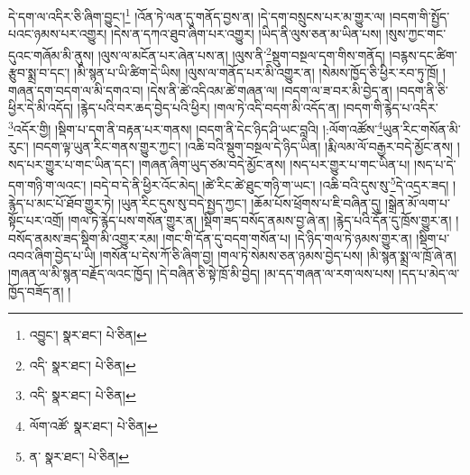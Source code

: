 དེ་དག་ལ་འདིར་ཅི་ཞིག་བྱུང་།\footnote{འབྱུང་།  སྣར་ཐང་།  པེ་ཅིན། } །འོན་ཏེ་ལན་དུ་གནོད་བྱས་ན། །དེ་དག་བསྲུངས་པར་མ་གྱུར་ལ། །བདག་གི་སྤྱོད་པའང་ཉམས་པར་འགྱུར། །དེས་ན་དཀའ་ཐུབ་ཞིག་པར་འགྱུར། །ཡིད་ནི་ལུས་ཅན་མ་ཡིན་པས། །སུས་ཀྱང་གང་དུའང་གཞོམ་མི་ནུས། །ལུས་ལ་མངོན་པར་ཞེན་པས་ན། །ལུས་ནི་\footnote{འདི་  སྣར་ཐང་།  པེ་ཅིན། }སྡུག་བསྔལ་དག་གིས་གནོད། །བརྙས་དང་ཚིག་རྩུབ་སྨྲ་བ་དང་། །མི་སྙན་པ་ཡི་ཚིག་དེ་ཡིས། །ལུས་ལ་གནོད་པར་མི་འགྱུར་ན། །སེམས་ཁྱོད་ཅི་ཕྱིར་རབ་ཏུ་ཁྲོ། །གཞན་དག་བདག་ལ་མི་དགའ་བ། །དེས་ནི་ཚེ་འདིའམ་ཚེ་གཞན་ལ། །བདག་ལ་ཟ་བར་མི་བྱེད་ན། །བདག་ནི་ཅི་ཕྱིར་དེ་མི་འདོད། །རྙེད་པའི་བར་ཆད་བྱེད་པའི་ཕྱིར། །གལ་ཏེ་འདི་བདག་མི་འདོད་ན། །བདག་གི་རྙེད་པ་འདིར་\footnote{འདི་  སྣར་ཐང་།  པེ་ཅིན། }འདོར་གྱི། །སྡིག་པ་དག་ནི་བརྟན་པར་གནས། །བདག་ནི་དེང་ཉིད་ཤི་ཡང་བླའི། །:ལོག་འཚོས་\footnote{ལོག་འཚོ་  སྣར་ཐང་།  པེ་ཅིན། }ཡུན་རིང་གསོན་མི་རུང་། །བདག་ལྟ་ཡུན་རིང་གནས་གྱུར་ཀྱང་། །འཆི་བའི་སྡུག་བསྔལ་དེ་ཉིད་ཡིན། །རྨི་ལམ་ལོ་བརྒྱར་བདེ་མྱོང་ནས། །སད་པར་གྱུར་པ་གང་ཡིན་དང་། །གཞན་ཞིག་ཡུད་ཙམ་བདེ་མྱོང་ནས། །སད་པར་གྱུར་པ་གང་ཡིན་པ། །སད་པ་དེ་དག་གཉི་ག་ལའང་། །བདེ་བ་དེ་ནི་ཕྱིར་འོང་མེད། །ཚེ་རིང་ཚེ་ཐུང་གཉི་ག་ཡང་། །འཆི་བའི་དུས་སུ་\footnote{ན་  སྣར་ཐང་།  པེ་ཅིན། }དེ་འདྲར་ཟད། །རྙེད་པ་མང་པོ་ཐོབ་གྱུར་ཏེ། །ཡུན་རིང་དུས་སུ་བདེ་སྤྱད་ཀྱང་། །ཆོམ་པོས་ཕྲོགས་པ་ཇི་བཞིན་དུ། །སྒྲེན་མོ་ལག་པ་སྟོང་པར་འགྲོ། །གལ་ཏེ་རྙེད་པས་གསོན་གྱུར་ན། །སྡིག་ཟད་བསོད་ནམས་བྱ་ཞེ་ན། །རྙེད་པའི་དོན་དུ་ཁྲོས་གྱུར་ན། །བསོད་ནམས་ཟད་སྡིག་མི་འགྱུར་རམ། །གང་གི་དོན་དུ་བདག་གསོན་པ། །དེ་ཉིད་གལ་ཏེ་ཉམས་གྱུར་ན། །སྡིག་པ་འབའ་ཞིག་བྱེད་པ་ཡི། །གསོན་པ་དེས་ཀོ་ཅི་ཞིག་བྱ། །གལ་ཏེ་སེམས་ཅན་ཉམས་བྱེད་པས། །མི་སྙན་སྨྲ་ལ་ཁྲོ་ཞེ་ན། །གཞན་ལ་མི་སྙན་བརྗོད་ལའང་ཁྱོད། །དེ་བཞིན་ཅི་སྟེ་ཁྲོ་མི་བྱེད། །མ་དད་གཞན་ལ་རག་ལས་པས། །དད་པ་མེད་ལ་ཁྱོད་བཟོད་ན། །
